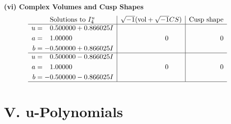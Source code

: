 \documentclass[1p]{elsarticle_modified}
\theoremstyle{definition}
\newcommand{\I}{\sqrt{-1}}
\begin{document}
\newpage\flushleft \textbf{(vi) Complex Volumes and Cusp Shapes}
$$\begin{array}{c|c|c}  
\text{Solutions to }I^u_{4}& \I (\text{vol} + \sqrt{-1}CS) & \text{Cusp shape}\\
 \hline 
\begin{aligned}
u &= \phantom{-}0.500000 + 0.866025 I \\
a &= \phantom{-}1.00000\phantom{ +0.000000I} \\
b &= -0.500000 + 0.866025 I\end{aligned}
 & \phantom{-0.000000 } 0 & \phantom{-0.000000 } 0 \\ \hline\begin{aligned}
u &= \phantom{-}0.500000 - 0.866025 I \\
a &= \phantom{-}1.00000\phantom{ +0.000000I} \\
b &= -0.500000 - 0.866025 I\end{aligned}
 & \phantom{-0.000000 } 0 & \phantom{-0.000000 } 0\\
 \hline 
 \end{array}$$\newpage
\newpage\renewcommand{\arraystretch}{1}
\centering \section*{ V. u-Polynomials}
\end{document}
